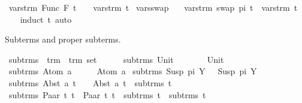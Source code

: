 \begin{isabellebody}
{\isacharbar}{\kern0pt}\ {\isachardoublequoteopen}vars{\isacharunderscore}{\kern0pt}trm\ {\isacharparenleft}{\kern0pt}Func\ F\ t{\isacharparenright}{\kern0pt}\ \ \ {\isacharequal}{\kern0pt}\ vars{\isacharunderscore}{\kern0pt}trm\ t{\isachardoublequoteclose}\isanewline
\isanewline
{}\isamarkupfalse%
\ vars{\isacharunderscore}{\kern0pt}swap{\isacharcolon}{\kern0pt}\isanewline
\ \ \ {\isachardoublequoteopen}vars{\isacharunderscore}{\kern0pt}trm\ {\isacharparenleft}{\kern0pt}swap\ pi\ t{\isacharparenright}{\kern0pt}\ {\isacharequal}{\kern0pt}\ vars{\isacharunderscore}{\kern0pt}trm\ t{\isachardoublequoteclose}\isanewline
%
\isadelimproof
\ \ %
\endisadelimproof
%
\isatagproof
{}\isamarkupfalse%
\ {\isacharparenleft}{\kern0pt}induct\ t{\isacharparenright}{\kern0pt}\ auto%
\endisatagproof
{\isafoldproof}%
%
\isadelimproof
%
\endisadelimproof
%
\begin{isamarkuptext}%
Subterms and proper subterms.%
\end{isamarkuptext}\isamarkuptrue%
\isamarkupfalse%
\ sub{\isacharunderscore}{\kern0pt}trms\ {\isacharcolon}{\kern0pt}{\isacharcolon}{\kern0pt}\ {\isachardoublequoteopen}trm\ {\isasymRightarrow}\ trm\ set{\isachardoublequoteclose}\isanewline
\ \ \ \isanewline
\ \ {\isachardoublequoteopen}sub{\isacharunderscore}{\kern0pt}trms\ {\isacharparenleft}{\kern0pt}Unit{\isacharparenright}{\kern0pt}\ \ \ \ \ \ \ {\isacharequal}{\kern0pt}\ {\isacharbraceleft}{\kern0pt}Unit{\isacharbraceright}{\kern0pt}{\isachardoublequoteclose}\isanewline
{\isacharbar}{\kern0pt}\ {\isachardoublequoteopen}sub{\isacharunderscore}{\kern0pt}trms\ {\isacharparenleft}{\kern0pt}Atom\ a{\isacharparenright}{\kern0pt}\ \ \ \ \ {\isacharequal}{\kern0pt}\ {\isacharbraceleft}{\kern0pt}Atom\ a{\isacharbraceright}{\kern0pt}{\isachardoublequoteclose}\isanewline
{\isacharbar}{\kern0pt}\ {\isachardoublequoteopen}sub{\isacharunderscore}{\kern0pt}trms\ {\isacharparenleft}{\kern0pt}Susp\ pi\ Y{\isacharparenright}{\kern0pt}\ \ {\isacharequal}{\kern0pt}\ {\isacharbraceleft}{\kern0pt}Susp\ pi\ Y{\isacharbraceright}{\kern0pt}{\isachardoublequoteclose}\isanewline
{\isacharbar}{\kern0pt}\ {\isachardoublequoteopen}sub{\isacharunderscore}{\kern0pt}trms\ {\isacharparenleft}{\kern0pt}Abst\ a\ t{\isacharparenright}{\kern0pt}\ \ \ {\isacharequal}{\kern0pt}\ {\isacharbraceleft}{\kern0pt}Abst\ a\ t{\isacharbraceright}{\kern0pt}\ {\isasymunion}\ sub{\isacharunderscore}{\kern0pt}trms\ t{\isachardoublequoteclose}\isanewline
{\isacharbar}{\kern0pt}\ {\isachardoublequoteopen}sub{\isacharunderscore}{\kern0pt}trms\ {\isacharparenleft}{\kern0pt}Paar\ t{}\ t{}{\isacharparenright}{\kern0pt}\ {\isacharequal}{\kern0pt}\ {\isacharbraceleft}{\kern0pt}Paar\ t{}\ t{}{\isacharbraceright}{\kern0pt}\ {\isasymunion}\ sub{\isacharunderscore}{\kern0pt}trms\ t{}\ {\isasymunion}\ sub{\isacharunderscore}{\kern0pt}trms\ t{}{\isachardoublequoteclose}\isanewline

\end{isabellebody}
